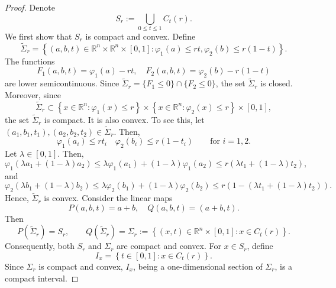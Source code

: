 \documentclass[10pt,a4paper]{amsart}
\begin{document}
\begin{proof}
    Denote
    \[
        S_r:=\bigcup_{0 \leq t \leq 1} C_t(r).
    \]
    We first show that $S_r$ is compact and convex.
    Define
$$
\widetilde{\Sigma}_r=\left\{(a, b, t) \in \mathbb{R}^n \times \mathbb{R}^n \times[0,1]: \varphi_1(a) \leq r t, \varphi_2(b) \leq r(1-t)\right\} .
$$
The functions
$$
F_1(a, b, t) = \varphi_1(a)-r t, \quad F_2(a, b, t) = \varphi_2(b)-r(1-t)
$$
are lower semicontinuous. Since $ \widetilde{\Sigma}_r = \{F_1\leq 0\} \cap \{ F_2 \leq 0\}$,  the set $\widetilde{\Sigma}_r$ is closed. Moreover, since
$$
\widetilde{\Sigma}_r \subset \left\{x \in \mathbb{R}^n: \varphi_1(x) \leq r\right\} \times \left\{x \in \mathbb{R}^n: \varphi_2(x) \leq r\right\} \times[0,1],
$$
the set $\widetilde{\Sigma}_r$ is compact. It is also convex.  To see this,
    let $(a_1,b_1,t_1),(a_2,b_2,t_2) \in \widetilde{\Sigma}_r$. Then,
    \[
    \varphi_1(a_i) \leq rt_i \quad \varphi_2(b_i) \leq r(1-t_i) \qquad \text{for } i =1,2.
    \]
    Let $\lambda \in [0,1]$. Then,
    \[
        \varphi_1 (\lambda a_1 +(1-\lambda)a_2) \leq \lambda \varphi_1\left(a_1\right)+(1-\lambda) \varphi_1\left(a_2\right) \leq r (\lambda t_1+(1-\lambda) t_2),
    \]
    and
    \[
        \varphi_2 (\lambda b_1+(1-\lambda) b_2) \leq \lambda \varphi_2\left(b_1\right)+(1-\lambda) \varphi_2\left(b_2\right) \leq r(1-(\lambda t_1+(1-\lambda) t_2)).
    \]
    Hence, $\widetilde{\Sigma}_r$ is convex.
    Consider the linear maps
    $$
    P(a, b, t)=a+b, \quad Q(a, b, t)=(a+b, t) .
    $$
    Then
    $$
    P\left(\widetilde{\Sigma}_r\right)=S_r
    , \qquad
    Q\left(\widetilde{\Sigma}_r\right)=\Sigma_r:=\left\{(x, t) \in \mathbb{R}^n \times[0,1]: x \in C_t(r)\right\} .
    $$
    Consequently, both $S_r$ and $\Sigma_r$ are compact and convex.
    For $x \in S_r$, define
    $$
    I_x=\left\{t \in[0,1]: x \in C_t(r)\right\} .
    $$
    Since $\Sigma_r$ is compact and convex, $I_x$, being a one-dimensional section of $\Sigma_r$, is a compact interval.


\end{proof}
\end{document}
